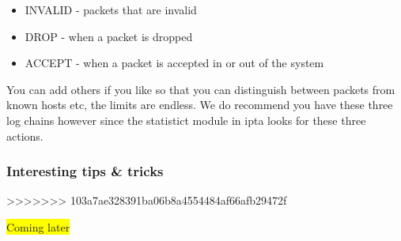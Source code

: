 \documentclass[english,twoside,openright,a4paper,12pt]{article}
\newcommand{\hilight}[1]{\colorbox{yellow}{#1}}
\begin{document}
\begin{itemize}
	\item INVALID - packets that are invalid
	\item DROP - when a packet is dropped
	\item ACCEPT - when a packet is accepted in or out of the system
\end{itemize}

You can add others if you like so that you can distinguish between packets from known hosts etc, the limits are endless. We do recommend you have these three log chains however since the statistict module in ipta looks for these three actions.

\subsubsection{Interesting tips \& tricks}
>>>>>>> 103a7ae328391ba06b8a4554484af66afb29472f

\hilight{Coming later}
\end{document}
